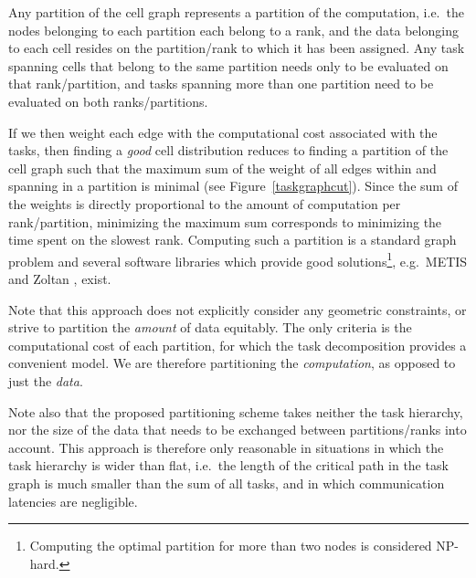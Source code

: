 \documentclass{sig-alternate-05-2015}
\begin{document}
Any partition of the cell graph represents a partition of the
computation, i.e.~the nodes belonging to each partition each belong
to a rank, and the
data belonging to each cell resides on the partition/rank to which
it has been assigned.
Any task spanning cells that belong to the same partition needs only
to be evaluated on that rank/partition, and tasks spanning more than
one partition need to be evaluated on both ranks/partitions.

If we then weight each edge with the computational cost associated with
the tasks, then finding a {\em good} cell distribution reduces to finding a
partition of the cell graph such that the maximum sum of the weight
of all edges within and spanning in a partition is minimal
(see Figure~\ref{taskgraphcut}).
Since the sum of the weights is directly proportional to the amount
of computation per rank/partition, minimizing the maximum sum
corresponds to minimizing the time spent on the slowest rank.
Computing such a partition is a standard graph problem and several
software libraries which provide good solutions\footnote{Computing
the optimal partition for more than two nodes is considered NP-hard.},
e.g.~METIS \cite{ref:Karypis1998} and Zoltan \cite{devine2002zoltan},
exist.

Note that this approach does not explicitly consider any geometric
constraints, or strive to partition the {\em amount} of data equitably.
The only criteria is the computational cost of each partition, for
which the task decomposition provides a convenient model.
We are therefore partitioning the {\em computation}, as opposed
to just the {\em data}.

Note also that the proposed partitioning scheme takes neither the
task hierarchy, nor the size of the data that needs to be exchanged
between partitions/ranks into account.
This approach is therefore only reasonable in situations in which
the task hierarchy is wider than flat, i.e.~the length of the critical
path in the task graph is much smaller than the sum of all tasks,
and in which communication latencies are negligible.
\end{document}
